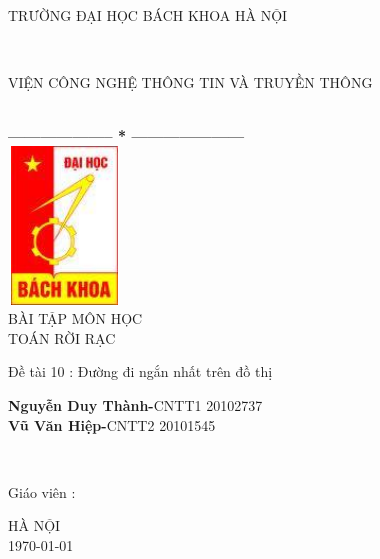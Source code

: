 \documentclass[a4paper,12pt]{report}
\begin{document}
	\thispagestyle{empty}
	\thisfancypage{
		\setlength{\fboxsep}{0pt}
		\fbox}{} 
	\begin{center}
		\begin{large}
			\textcolor[rgb]{1.00,0.00,0.00}{TRƯỜNG ĐẠI HỌC BÁCH KHOA HÀ NỘI}
		\end{large} \\
		\begin{large}
			\textcolor[rgb]{1.00,0.00,0.00}{VIỆN CÔNG NGHỆ THÔNG TIN VÀ TRUYỀN THÔNG}
		\end{large} \\
	
		\textbf{--------------------  *  ---------------------}\\[2cm]
	
		\includegraphics[width=3cm, height=4.2cm]{logo}\\[1cm]
		{\fontsize{32pt}{1}\selectfont BÀI TẬP MÔN HỌC}\\
		{\fontsize{20pt}{1}\selectfont TOÁN RỜI RẠC}\\[2cm]
	\end{center}
	
	\hspace{5cm}  Đề tài 10 : Đường đi ngắn nhất trên đồ thị
	\begin{flushright}
		\parbox[t]{8cm}{
		\textbf{Nguyễn Duy Thành-}CNTT1 20102737\\
                \textbf{Vũ Văn Hiệp-}CNTT2 20101545}\\[12pt]
	\end{flushright}
	
	\hspace{5cm} Giáo viên\hspace{24pt} :
	\begin{flushright} \textbf{\parbox[t]{8cm}{    
		\textcolor[rgb]{0.00,0.00,1.00}{Huỳnh Thanh Bình}
		}}
	\end{flushright}
	\vspace{2cm}
	\begin{center}
		{\fontsize{16pt}{1}\selectfont HÀ NỘI}\\
		{\fontsize{16pt}{1}\today}
	\end{center}
	
\end{document}
